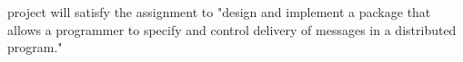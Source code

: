 \documentclass[11pt,journal,compsoc]{IEEEtran}
\begin{document}
\maketitle


\IEEEdisplaynontitleabstractindextext



\IEEEpeerreviewmaketitle







% 
% 
% 
% 
 project will satisfy the assignment to "design and implement a package that allows a programmer to specify and control delivery of messages in a distributed program."
\end{document}
